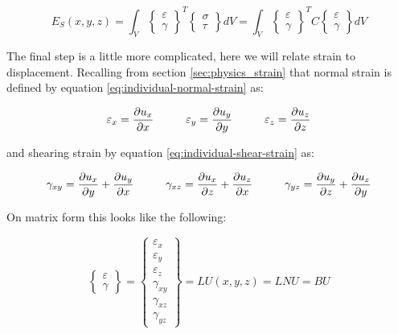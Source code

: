 \begin{equation}
E_S (x,y,z) = \int_V 
\begin{Bmatrix}
\varepsilon \\
\gamma
\end{Bmatrix}
^T
\begin{Bmatrix}
\sigma \\
\tau
\end{Bmatrix}
dV = \int_V
\begin{Bmatrix}
\varepsilon \\
\gamma
\end{Bmatrix}
^T C
\begin{Bmatrix}
\varepsilon \\
\gamma
\end{Bmatrix}
dV
\end{equation}

The final step is a little more complicated, here we will relate
strain to displacement. Recalling from section
\vref{sec:physics_strain} that normal strain is defined by equation
\eqref{eq:individual-normal-strain} as:

\begin{equation*}
\varepsilon_x = \frac{\partial u_x}{\partial x} \hspace{10 mm}
\varepsilon_y = \frac{\partial u_y}{\partial y} \hspace{10 mm}
\varepsilon_z = \frac{\partial u_z}{\partial z}
\end{equation*}

and shearing strain by equation \eqref{eq:individual-shear-strain} as:

\begin{equation*}
  \gamma_{xy} = \frac{\partial u_x}{\partial y} +
  \frac{\partial u_y}{\partial x} \hspace{10 mm}
  \gamma_{xz} = \frac{\partial u_x}{\partial z} +
  \frac{\partial u_z}{\partial x} \hspace{10 mm}
  \gamma_{yz} = \frac{\partial u_y}{\partial z} +
  \frac{\partial u_z}{\partial y}
\end{equation*}

On matrix form this looks like the following:

\begin{equation}
\begin{Bmatrix}
\varepsilon \\
\gamma
\end{Bmatrix}
= 
\begin{Bmatrix}
\varepsilon_x \\
\varepsilon_y \\
\varepsilon_z \\
\gamma_{xy} \\
\gamma_{xz} \\
\gamma_{yz}
\end{Bmatrix}
= L U(x,y,z) = L N U = B U
\end{equation}

